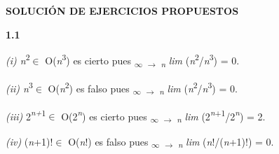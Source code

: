 \documentclass[12pt]{article}
\renewcommand{\_}{\kern-1.5pt\textunderscore\kern-1.5pt}
\begin{document}
\vspace{\baselineskip}

\vspace{\baselineskip}
\textbf{SOLUCIÓN DE EJERCICIOS PROPUESTOS } \par


\vspace{\baselineskip}
\textbf{1.1 }\par

\begin{adjustwidth}{0.58in}{2.66in}
{\fontsize{10pt}{12.0pt}\selectfont \textit{(i) n}\textsuperscript{2}$ \in $ O(\textit{n}\textsuperscript{3}) es cierto pues \textsubscript{$\infty$ $ \rightarrow $ \textit{n }}\textit{lim }(\textit{n}\textsuperscript{2}/\textit{n}\textsuperscript{3}) = 0. \par}\par

\end{adjustwidth}

\begin{adjustwidth}{0.58in}{2.71in}
{\fontsize{10pt}{12.0pt}\selectfont \textit{(ii) n}\textsuperscript{3}$ \in $ O(\textit{n}\textsuperscript{2}) es falso pues \textsubscript{$\infty$ $ \rightarrow $ \textit{n }}\textit{lim }(\textit{n}\textsuperscript{2}/\textit{n}\textsuperscript{3}) = 0. \par}\par

\end{adjustwidth}

\begin{adjustwidth}{0.58in}{2.44in}
{\fontsize{10pt}{12.0pt}\selectfont \textit{(iii) }2\textit{\textsuperscript{n+}}\textsuperscript{1}$ \in $ O(2\textit{\textsuperscript{n}}) es cierto pues \textsubscript{$\infty$ $ \rightarrow $ \textit{n }}\textit{lim }(2\textit{\textsuperscript{n}}\textsuperscript{+1}/2\textit{\textsuperscript{n}}) = 2. \par}\par

\end{adjustwidth}

\begin{adjustwidth}{0.58in}{2.17in}
{\fontsize{10pt}{12.0pt}\selectfont \textit{(iv) }(\textit{n}+1)!$ \in $ O(\textit{n}!) es falso pues \textsubscript{$\infty$ $ \rightarrow $ \textit{n }}\textit{lim }(\textit{n}!/(\textit{n}+1)!) = 0. \par}\par

\end{adjustwidth}
\end{document}
